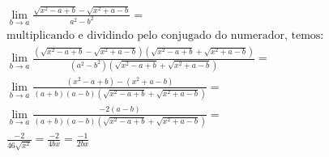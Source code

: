 \begin{ex}
\begin{align}
&\lim_{b\rightarrow a} \frac{\sqrt{x^2-a+b}-\sqrt{x^2+a-b}}{a^2-b^2}=\nonumber\\
&\text{multiplicando e dividindo pelo conjugado do numerador, temos:}\nonumber\\
&\lim_{b\rightarrow a} \frac{(\sqrt{x^2-a+b}-\sqrt{x^2+a-b})(\sqrt{x^2-a+b}+\sqrt{x^2+a-b})}{(a^2-b^2)(\sqrt{x^2-a+b}+\sqrt{x^2+a-b})}=\nonumber\\
&\lim_{b\rightarrow a} \frac{(x^2-a+b)-(x^2+a-b)}{(a+b)(a-b)(\sqrt{x^2-a+b}+\sqrt{x^2+a-b})}=\nonumber\\
&\lim_{b\rightarrow a} \frac{-2(a-b)}{(a+b)(a-b)(\sqrt{x^2-a+b}+\sqrt{x^2+a-b})}=\nonumber\\
&\frac{-2}{46\sqrt{x^2}}=\frac{-2}{4bx}=\frac{-1}{2bx}\nonumber
\end{align}
\end{ex}
